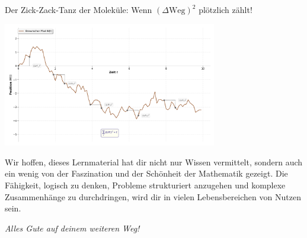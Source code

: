 \begin{funfactbox}{Der Zick-Zack-Tanz der Moleküle: Wenn $(\Delta \text{Weg})^2$ plötzlich zählt!}
\begin{center}
    \includegraphics[width=0.7\textwidth]{grafiken/Brownsche_Bewegung_QV.png}
    \label{fig:brownsche_bewegung_qv_funfact}
\end{center}
\end{funfactbox}

Wir hoffen, dieses Lernmaterial hat dir nicht nur Wissen vermittelt, sondern auch ein wenig von der Faszination und der Schönheit der Mathematik gezeigt. Die Fähigkeit, logisch zu denken, Probleme strukturiert anzugehen und komplexe Zusammenhänge zu durchdringen, wird dir in vielen Lebensbereichen von Nutzen sein.

\vspace{1em}
\begin{center}
    \Large\itshape Alles Gute auf deinem weiteren Weg!
\end{center}
\vspace{2em}

